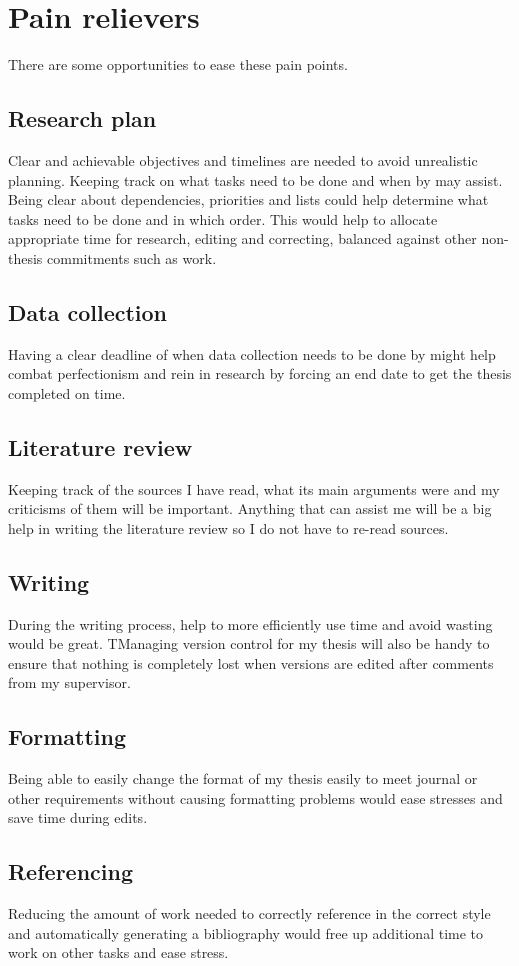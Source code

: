 \documentclass{article}
\begin{document}
\section*{Pain relievers}

There are some opportunities to ease these pain points.\par
\subsection*{Research plan}
Clear and achievable objectives and timelines are needed to avoid unrealistic planning. Keeping track on what tasks need to be done and when by may assist. Being clear about dependencies, priorities and lists could help determine what tasks need to be done and in which order. This would help to allocate appropriate time for research, editing and correcting, balanced against other non-thesis commitments such as work.
\subsection*{Data collection}
Having a clear deadline of when data collection needs to be done by might help combat perfectionism and rein in research by forcing an end date to get the thesis completed on time. 
\subsection*{Literature review}
Keeping track of the sources I have read, what its main arguments were and my criticisms of them will be important. Anything that can assist me will be a big help in writing the literature review so I do not have to re-read sources. 
\subsection*{Writing}
During the writing process, help to more efficiently use time and avoid wasting would be great. TManaging version control for my thesis will also be handy to ensure that nothing is completely lost when versions are edited after comments from my supervisor.\par
\subsection*{Formatting}
Being able to easily change the format of my thesis easily to meet journal or other requirements without causing formatting problems would ease stresses and save time during edits.
\subsection*{Referencing}
Reducing the amount of work needed to correctly reference in the correct style and automatically generating a bibliography would free up additional time to work on other tasks and ease stress.\par
\end{document}
